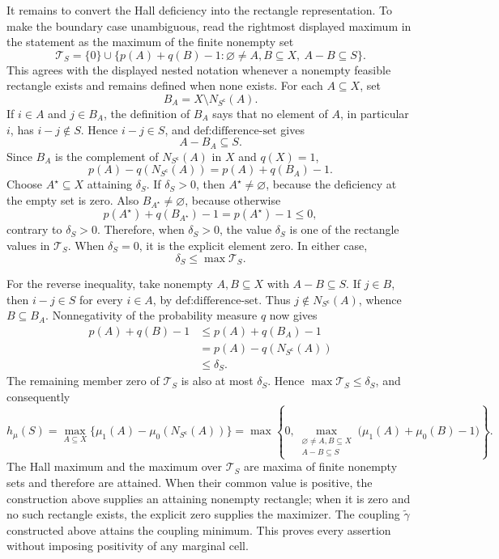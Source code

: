 It remains to convert the Hall deficiency into the rectangle representation.  To make the boundary case unambiguous, read the rightmost displayed maximum in the statement as the maximum of the finite nonempty set
\[
\mathcal T_S=\{0\}\cup
\{p(A)+q(B)-1:\varnothing\neq A,B\subseteq X,\ A-B\subseteq S\}.
\]
This agrees with the displayed nested notation whenever a nonempty feasible rectangle exists and remains defined when none exists.  For each \(A\subseteq X\), set
\[
B_A=X\setminus N_{S^{\mathsf c}}(A).
\]
If \(i\in A\) and \(j\in B_A\), the definition of \(B_A\) says that no element of \(A\), in particular \(i\), has \(i-j\notin S\).  Hence \(i-j\in S\), and \(\text{def:difference-set}\) gives
\[
A-B_A\subseteq S.
\]
Since \(B_A\) is the complement of \(N_{S^{\mathsf c}}(A)\) in \(X\) and \(q(X)=1\),
\[
p(A)-q(N_{S^{\mathsf c}}(A))
=p(A)+q(B_A)-1.
\]
Choose \(A^\star\subseteq X\) attaining \(\delta_S\).  If \(\delta_S>0\), then \(A^\star\neq\varnothing\), because the deficiency at the empty set is zero.  Also \(B_{A^\star}\neq\varnothing\), because otherwise
\[
p(A^\star)+q(B_{A^\star})-1=p(A^\star)-1\leq0,
\]
contrary to \(\delta_S>0\).  Therefore, when \(\delta_S>0\), the value \(\delta_S\) is one of the rectangle values in \(\mathcal T_S\).  When \(\delta_S=0\), it is the explicit element zero.  In either case,
\[
\delta_S\leq\max\mathcal T_S.
\]

For the reverse inequality, take nonempty \(A,B\subseteq X\) with \(A-B\subseteq S\).  If \(j\in B\), then \(i-j\in S\) for every \(i\in A\), by \(\text{def:difference-set}\).  Thus \(j\notin N_{S^{\mathsf c}}(A)\), whence \(B\subseteq B_A\).  Nonnegativity of the probability measure \(q\) now gives
\[
\begin{aligned}
p(A)+q(B)-1
&\leq p(A)+q(B_A)-1\\
&=p(A)-q(N_{S^{\mathsf c}}(A))\\
&\leq\delta_S.
\end{aligned}
\]
The remaining member zero of \(\mathcal T_S\) is also at most \(\delta_S\).  Hence \(\max\mathcal T_S\leq\delta_S\), and consequently
\[
h_\mu(S)
=\max_{A\subseteq X}\{\mu_1(A)-\mu_0(N_{S^{\mathsf c}}(A))\}
=\max\!\left\{0,
\max_{\substack{\varnothing\neq A,B\subseteq X\\A-B\subseteq S}}
\bigl(\mu_1(A)+\mu_0(B)-1\bigr)\right\}.
\]
The Hall maximum and the maximum over \(\mathcal T_S\) are maxima of finite nonempty sets and therefore are attained.  When their common value is positive, the construction above supplies an attaining nonempty rectangle; when it is zero and no such rectangle exists, the explicit zero supplies the maximizer.  The coupling \(\widetilde\gamma\) constructed above attains the coupling minimum.  This proves every assertion without imposing positivity of any marginal cell.
